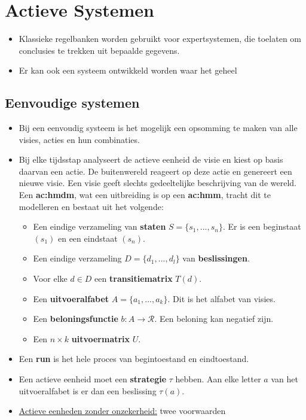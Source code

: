 \chapter{Actieve Systemen}
\begin{itemize}
	\item Klassieke regelbanken worden gebruikt voor expertsystemen, die toelaten om conclusies te trekken uit bepaalde gegevens.
	\item Er kan ook een systeem ontwikkeld worden waar het geheel
\end{itemize}
\section{Eenvoudige systemen}
\begin{itemize}
	\item Bij een eenvoudig systeem is het mogelijk een opsomming te maken van alle visies, acties en hun combinaties.
	\item Bij elke tijdsstap analyseert de actieve eenheid de visie en kiest op basis daarvan een actie. De buitenwereld reageert op deze actie en genereert een nieuwe visie.
	\alert Een visie geeft slechts gedeeltelijke beschrijving van de wereld. Een \textbf{\gls{ac:hmdm}}, wat een uitbreiding is op een \textbf{\gls{ac:hmm}}, tracht dit te modelleren en bestaat uit het volgende:
	\begin{itemize}
		\item Een eindige verzameling van \textbf{staten} $S = \{s_1, ..., s_n\}$. Er is een beginstaat $(s_1)$ en een eindstaat $(s_n)$.
		\item Een eindige verzameling $D = \{d_1, ..., d_l\}$ van \textbf{beslissingen}.
		\item Voor elke $d \in D$ een \textbf{transitiematrix} $T(d)$.
		\item Een \textbf{uitvoeralfabet} $A = \{a_1, ..., a_k\}$. Dit is het alfabet van visies.
		\item Een \textbf{beloningsfunctie} $b: A \rightarrow \mathcal{R}$. Een beloning kan negatief zijn.
		\item Een $n \times k$ \textbf{uitvoermatrix} $U$.
	\end{itemize}
	\item Een \textbf{run} is het hele proces van begintoestand en eindtoestand. 
	\item Een actieve eenheid moet een \textbf{strategie} $\tau$ hebben. Aan elke letter $a$ van het uitvoeralfabet is er dan een beslissing $\tau(a)$.
	\item \underline{Actieve eenheden zonder onzekerheid:} twee voorwaarden

\end{itemize}
